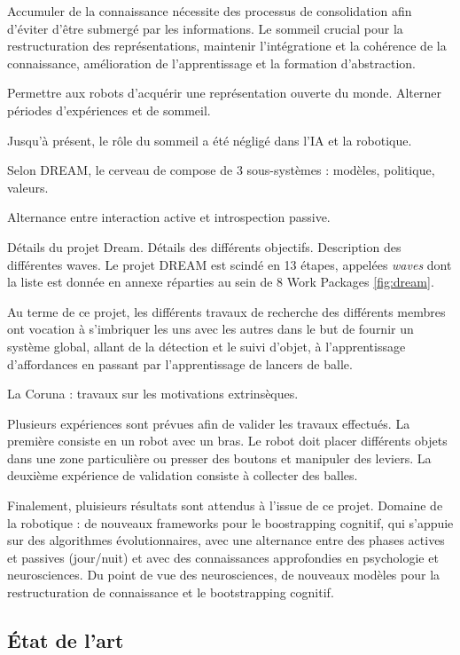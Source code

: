 \documentclass{llncs}
\begin{document}
Accumuler de la connaissance nécessite des processus de consolidation afin d'éviter d'être submergé par les informations. Le sommeil crucial pour la restructuration des représentations, maintenir l'intégratione et la cohérence de la connaissance, amélioration de l'apprentissage et la formation d'abstraction.

Permettre aux robots d'acquérir une représentation ouverte du monde. Alterner périodes d'expériences et de sommeil.

Jusqu'à présent, le rôle du sommeil a été négligé dans l'IA et la robotique.

Selon DREAM, le cerveau de compose de 3 sous-systèmes : modèles, politique, valeurs.

Alternance entre interaction active et introspection passive.

Détails du projet Dream.
Détails des différents objectifs.
Description des différentes waves.
Le projet DREAM est scindé en 13 étapes, appelées \textit{waves} dont la liste est donnée en annexe réparties au sein de 8 Work Packages \ref{fig:dream}.

Au terme de ce projet, les différents travaux de recherche des différents membres ont vocation à s'imbriquer les uns avec les autres dans le but de fournir un système global, allant de la détection et le suivi d'objet, à l'apprentissage d'affordances en passant par l'apprentissage de lancers de balle.

La Coruna : travaux sur les motivations extrinsèques.

Plusieurs expériences sont prévues afin de valider les travaux effectués. La première consiste en un robot avec un bras. Le robot doit placer différents objets dans une zone particulière ou presser des boutons et manipuler des leviers. La deuxième expérience de validation consiste à collecter des balles.

Finalement, pluisieurs résultats sont attendus à l'issue de ce projet. Domaine de la robotique : de nouveaux frameworks pour le boostrapping cognitif, qui s'appuie sur des algorithmes évolutionnaires, avec une alternance entre des phases actives et passives (jour/nuit) et avec des connaissances approfondies en psychologie et neurosciences. Du point de vue des neurosciences, de nouveaux modèles pour la restructuration de connaissance et le bootstrapping cognitif.





\subsection{\'Etat de l'art}
\end{document}

